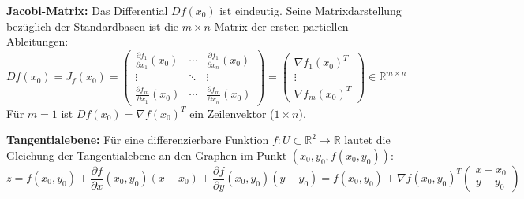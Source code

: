 \begin{lemma}
    \textbf{Jacobi-Matrix:} Das Differential $Df(x_0)$ ist eindeutig. Seine Matrixdarstellung bezüglich der Standardbasen ist die $m \times n$-Matrix der ersten partiellen Ableitungen:
    $$ Df(x_0) = J_f(x_0) = \begin{pmatrix}
        \frac{\partial f_1}{\partial x_1}(x_0) & \cdots & \frac{\partial f_1}{\partial x_n}(x_0) \\
        \vdots & \ddots & \vdots \\
        \frac{\partial f_m}{\partial x_1}(x_0) & \cdots & \frac{\partial f_m}{\partial x_n}(x_0)
    \end{pmatrix} = \begin{pmatrix} \nabla f_1(x_0)^T \\ \vdots \\ \nabla f_m(x_0)^T \end{pmatrix} \in \mathbb{R}^{m \times n} $$
    Für $m = 1$ ist $Df(x_0) = \nabla f(x_0)^T$ ein Zeilenvektor ($1 \times n$).
\end{lemma}

\begin{definition}
    \textbf{Tangentialebene:} Für eine differenzierbare Funktion $f: U \subset \mathbb{R}^2 \to \mathbb{R}$ lautet die Gleichung der Tangentialebene an den Graphen im Punkt $(x_0, y_0, f(x_0, y_0))$:
    $$ z = f(x_0, y_0) + \frac{\partial f}{\partial x}(x_0, y_0)(x - x_0) + \frac{\partial f}{\partial y}(x_0, y_0)(y - y_0) = f(x_0, y_0) + \nabla f(x_0, y_0)^T \begin{pmatrix} x - x_0 \\ y - y_0 \end{pmatrix} $$
\end{definition}


